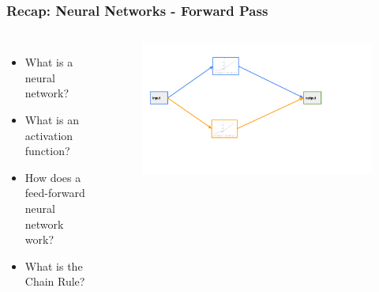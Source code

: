 \documentclass[aspectratio=169]{beamer}
\newcommand{\myblue}[1]{{\color{blue}{#1}}}
\begin{document}
\begin{frame}[fragile]\frametitle{Recap: Neural Networks - Forward Pass}
\myblue{What did we talk about last?}
\begin{columns}
        \begin{itemize}
            \item What is a neural network?
            \item What is an activation function?
            \item How does a feed-forward neural network work?
            \item What is the Chain Rule?
        \end{itemize}
        \begin{figure}
        \centering
        \includegraphics[trim={1cm 3cm 5cm 0.35cm },clip,width=\linewidth]{BP_2}
        \end{figure}
\end{columns}
\end{frame}
\end{document}

